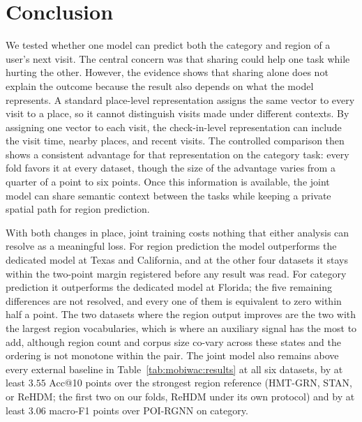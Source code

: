 \section{Conclusion}
\label{sec:mobiwac:conclusion}

We tested whether one model can predict both the category and region of a user's next visit. The central concern was
that sharing could help one task while hurting the other. However, the evidence shows that sharing alone does not
explain the outcome because the result also depends on what the model represents. A standard place-level representation
assigns the same vector to every visit to a place, so it cannot distinguish visits made under different contexts. By
assigning one vector to each visit, the check-in-level representation can include the visit time, nearby places, and
recent visits. The controlled comparison then shows a consistent advantage for that representation on the category
task: every fold favors it at every dataset, though the size of the advantage varies from a quarter of a point to
six points. Once this information is available, the joint model can share
semantic context between the tasks while keeping a private spatial path for region prediction.

With both changes in place, joint training costs nothing that either analysis can resolve as a
meaningful loss. For region
prediction the model outperforms the dedicated model at Texas and California, and at the other four
datasets it stays within the two-point margin registered before any result was read. For category
prediction it outperforms the dedicated model at Florida; the five remaining differences are not
resolved, and every one of them is equivalent to zero within half a point. The two datasets where
the region output improves are the two with the largest region vocabularies, which is where an
auxiliary signal has the most to add, although region count and corpus size co-vary across these
states and the ordering is not monotone within the pair. The joint model also remains above every
external baseline in Table~\ref{tab:mobiwac:results} at all six datasets, by at least $3.55$ Acc@10
points over the strongest region reference (HMT-GRN, STAN, or ReHDM; the first two on our folds,
ReHDM under its own protocol) and by at least $3.06$ macro-F1 points over POI-RGNN on category.

